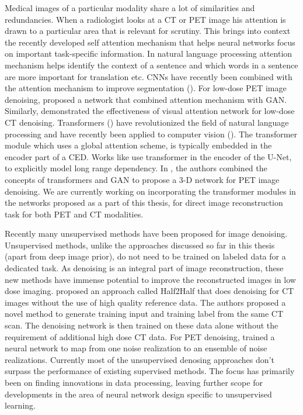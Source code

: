 Medical images of a particular modality share a lot of similarities and redundancies. When a radiologist looks at a \ac{CT} or \ac{PET} image his attention is drawn to a particular area that is relevant for scrutiny. This brings into context the recently developed self attention mechanism that helps neural networks focus on important task-specific information. In natural language processing attention mechanism helps identify the context of a sentence and which words in a sentence are more important for translation etc. \acp{CNN} have recently been combined with the attention mechanism to improve segmentation (\cite{li2020attention,hu2020parallel}). For low-dose \ac{PET} image denoising, \cite{xue20203d} proposed a network that combined attention mechanism with \ac{GAN}. Similarly, \cite{du2019visual} demonstrated the effectiveness of visual attention network for low-dose \ac{CT} denoising. Transformers (\cite{vaswani2017attention}) have revolutionized the field of natural language processing and have recently been applied to computer vision (\cite{khan2021transformers}). The transformer module which uses a global attention scheme, is typically embedded in the encoder part of a \ac{CED}. Works like \cite{chen2021transunet} use transformer in the encoder of the U-Net, to explicitly model long range dependency. In \cite{luo20213d}, the authors combined the concepts of transformers and \acs{GAN} to propose a 3-D network for \ac{PET} image denoising. We are currently working on incorporating the transformer modules in the networks proposed as a part of this thesis, for direct image reconstruction task for both \ac{PET} and \ac{CT} modalities.

Recently many unsupervised methods have been proposed for image denoising. Unsupervised methods, unlike the approaches discussed so far in this thesis (apart from deep image prior), do not need to be trained on labeled data for a dedicated task. As denoising is an integral part of image reconstruction, these new methods have immense potential to improve the reconstructed images in low dose imaging. \cite{yuan2020half2half} proposed an approach called Half2Half that does denoising for \ac{CT} images without the use of high quality reference data. The authors proposed a novel method to generate training input and training label from the same \ac{CT} scan. The denoising network is then trained on these data alone without the requirement of additional high dose \ac{CT} data. For \ac{PET} denoising, \cite{chan2019noise} trained a neural network to map from one noise realization to an ensemble of noise realizations. Currently most of the unsupervised denosing approaches don't surpass the performance of existing supervised methods. The focus has primarily been on finding innovations in data processing, leaving further scope for developments in the area of neural network design specific to unsupervised learning. 

